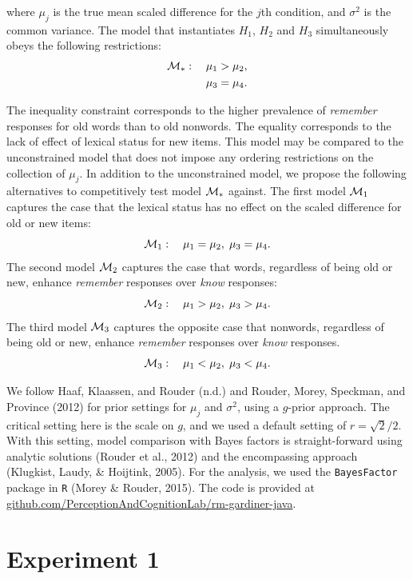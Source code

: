 \documentclass[english,,man]{apa6}
\begin{document}
where \(\mu_j\) is the true mean scaled difference for the \(j\)th condition, and \(\sigma^2\) is the common variance. The model that instantiates \(H_1\), \(H_2\) and \(H_3\) simultaneously obeys the following restrictions:
\[
\begin{aligned}
{\cal M}_*: \quad \mu_1 &> \mu_2,\\
\mu_3 &= \mu_4.\\
\end{aligned}
\]

The inequality constraint corresponds to the higher prevalence of \emph{remember} responses for old words than to old nonwords. The equality corresponds to the lack of effect of lexical status for new items. This model may be compared to the unconstrained model that does not impose any ordering restrictions on the collection of \(\mu_j\). In addition to the unconstrained model, we propose the following alternatives to competitively test model \({\cal M}_*\) against. The first model \({\cal M}_1\) captures the case that the lexical status has no effect on the scaled difference for old or new items:
\[
{\cal M}_1: \quad \mu_1 = \mu_2, \; \mu_3=\mu_4.
\]
The second model \({\cal M}_2\) captures the case that words, regardless of being old or new, enhance \emph{remember} responses over \emph{know} responses:
\[
{\cal M}_2: \quad \mu_1 > \mu_2, \; \mu_3 > \mu_4.
\]
The third model \({\cal M}_3\) captures the opposite case that nonwords, regardless of being old or new, enhance \emph{remember} responses over \emph{know} responses.
\[
{\cal M}_3: \quad \mu_1 < \mu_2, \; \mu_3 < \mu_4.
\]

We follow Haaf, Klaassen, and Rouder (n.d.) and Rouder, Morey, Speckman, and Province (2012) for prior settings for \(\mu_j\) and \(\sigma^2\), using a \(g\)-prior approach. The critical setting here is the scale on \(g\), and we used a default setting of \(r = \sqrt{2}/2\). With this setting, model comparison with Bayes factors is straight-forward using analytic solutions (Rouder et al., 2012) and the encompassing approach (Klugkist, Laudy, \& Hoijtink, 2005). For the analysis, we used the \texttt{BayesFactor} package in \texttt{R} (Morey \& Rouder, 2015). The code is provided at \href{https://github.com/PerceptionAndCognitionLab/rm-gardiner-java}{github.com/PerceptionAndCognitionLab/rm-gardiner-java}.

\hypertarget{experiment-1}{%
\section{Experiment 1}\label{experiment-1}}
\end{document}
